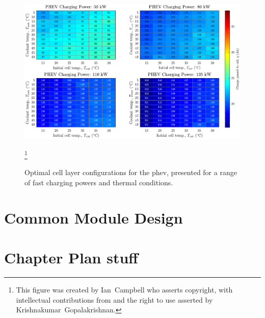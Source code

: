 \begin{figure}[!bp]
    \begin{minipage}[t]{\textwidth}
        \centering
        \includegraphics[width=\textwidth]{fig_generate_heatmap_PHEV}
        \captionsetup{labelsep=note}
        \caption[Optimal cell layer configurations for the \gls{phev}, presented for a range of
        fast charging powers and thermal conditions]{Optimal cell layer configurations for the \gls{phev}, presented for a range of
        fast charging powers and thermal conditions.}
        \label{fig:fig_generate_heatmap_PHEV}
        \mpfootnotes[1]
        \footnote{This figure was created by \mbox{Ian Campbell} who asserts copyright,
            with intellectual contributions from and the right to use asserted by
        \mbox{Krishnakumar Gopalakrishnan}.}
    \end{minipage}
\end{figure}
\section{Common Module Design}\label{sec:commonmodulelayeropt}

\section{Chapter Plan stuff}


